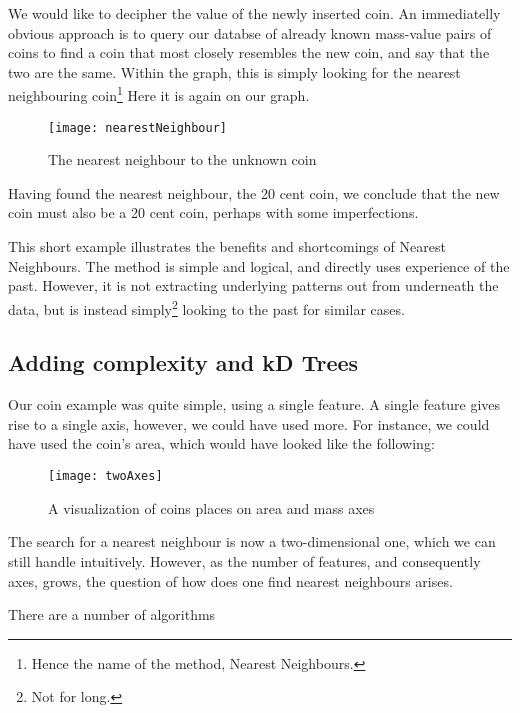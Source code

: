 \documentclass[a4paper, 12pt]{article}
\begin{document}
                \par We would like to decipher the value of the newly inserted coin. An immediatelly obvious approach is to query our databse of already known mass-value pairs of coins to find a coin that most closely resembles the new coin, and say that the two are the same. Within the graph, this is simply looking for the nearest neighbouring coin\footnote{Hence the name of the method, Nearest Neighbours.} Here it is again on our graph.

                \begin{figure}[h]
                    \caption{The nearest neighbour to the unknown coin}
                    \centering
                    \texttt{[image: nearestNeighbour]}
                \end{figure}

                \par Having found the nearest neighbour, the 20 cent coin, we conclude that the new coin must also be a 20 cent coin, perhaps with some imperfections.

                \par This short example illustrates the benefits and shortcomings of Nearest Neighbours. The method is simple and logical, and directly uses experience of the past. However, it is not extracting underlying patterns out from underneath the data, but is instead simply\footnote{Not for long.} looking to the past for similar cases.

            \newpage

            \subsection{Adding complexity and kD Trees}

                \par Our coin example was quite simple, using a single feature. A single feature gives rise to a single axis, however, we could have used more. For instance, we could have used the coin's area, which would have looked like the following:
                
                \begin{figure}[h]
                    \caption{A visualization of coins places on area and mass axes}
                    \centering
                    \texttt{[image: twoAxes]}
                \end{figure}

                \par The search for a nearest neighbour is now a two-dimensional one, which we can still handle intuitively. However, as the number of features, and consequently axes, grows, the question of how does one find nearest neighbours arises.

                \par There are a number of algorithms 
\end{document}

